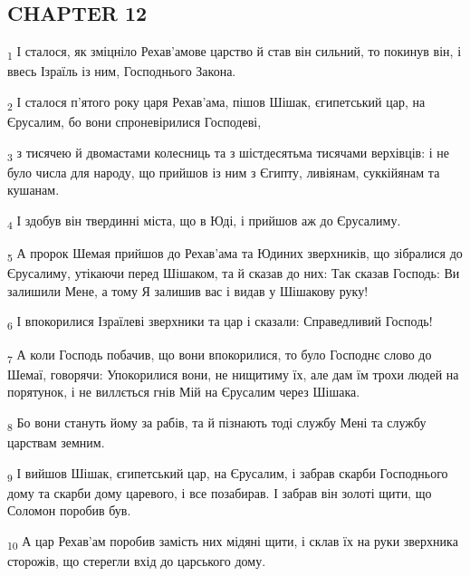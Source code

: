\subsection{CHAPTER 12}
\begin{tcolorbox}
\textsubscript{1} І сталося, як зміцніло Рехав'амове царство й став він сильний, то покинув він, і ввесь Ізраїль із ним, Господнього Закона.
\end{tcolorbox}
\begin{tcolorbox}
\textsubscript{2} І сталося п'ятого року царя Рехав'ама, пішов Шішак, єгипетський цар, на Єрусалим, бо вони спроневірилися Господеві,
\end{tcolorbox}
\begin{tcolorbox}
\textsubscript{3} з тисячею й двомастами колесниць та з шістдесятьма тисячами верхівців: і не було числа для народу, що прийшов із ним з Єгипту, ливіянам, суккійянам та кушанам.
\end{tcolorbox}
\begin{tcolorbox}
\textsubscript{4} І здобув він твердинні міста, що в Юді, і прийшов аж до Єрусалиму.
\end{tcolorbox}
\begin{tcolorbox}
\textsubscript{5} А пророк Шемая прийшов до Рехав'ама та Юдиних зверхників, що зібралися до Єрусалиму, утікаючи перед Шішаком, та й сказав до них: Так сказав Господь: Ви залишили Мене, а тому Я залишив вас і видав у Шішакову руку!
\end{tcolorbox}
\begin{tcolorbox}
\textsubscript{6} І впокорилися Ізраїлеві зверхники та цар і сказали: Справедливий Господь!
\end{tcolorbox}
\begin{tcolorbox}
\textsubscript{7} А коли Господь побачив, що вони впокорилися, то було Господнє слово до Шемаї, говорячи: Упокорилися вони, не нищитиму їх, але дам їм трохи людей на порятунок, і не виллється гнів Мій на Єрусалим через Шішака.
\end{tcolorbox}
\begin{tcolorbox}
\textsubscript{8} Бо вони стануть йому за рабів, та й пізнають тоді службу Мені та службу царствам земним.
\end{tcolorbox}
\begin{tcolorbox}
\textsubscript{9} І вийшов Шішак, єгипетський цар, на Єрусалим, і забрав скарби Господнього дому та скарби дому царевого, і все позабирав. І забрав він золоті щити, що Соломон поробив був.
\end{tcolorbox}
\begin{tcolorbox}
\textsubscript{10} А цар Рехав'ам поробив замість них мідяні щити, і склав їх на руки зверхника сторожів, що стерегли вхід до царського дому.
\end{tcolorbox}
